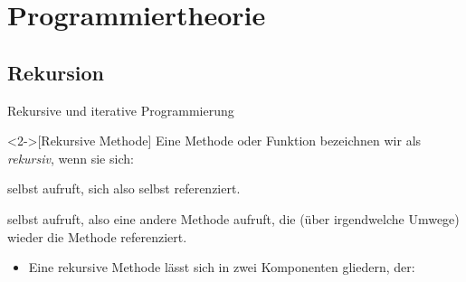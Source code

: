 
\section{Programmiertheorie}

\subsection{Rekursion}
\begin{frame}[fragile]{Rekursive und iterative Programmierung}
    \begin{definition}<2->[Rekursive Methode]
        \pause{}Eine Methode oder Funktion bezeichnen wir als \emph{rekursiv}, wenn sie sich:\pause{} \begin{description}[indirekt]
            \item[direkt] selbst aufruft, sich also selbst referenziert.\pause{}
            \item[indirekt] selbst aufruft, also eine andere Methode aufruft, die (über irgendwelche Umwege) wieder die Methode referenziert.
        \end{description}
    \end{definition}
    \begin{itemize}[<+(1)->]
        \widei
        \item Eine rekursive Methode lässt sich in zwei Komponenten gliedern, der: 
    \end{itemize}
\end{frame}

